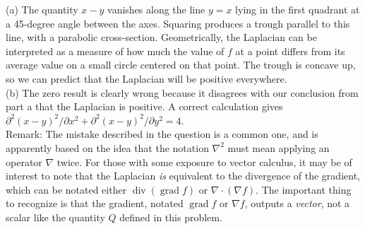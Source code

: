 (a) The quantity $x-y$ vanishes along the line $y=x$ lying in the
first quadrant at a 45-degree angle between the axes. Squaring produces
a trough parallel to this line, with a parabolic cross-section. Geometrically,
the Laplacian can be interpreted as a measure of how much the value of $f$
at a point differs from its average value on a small circle centered on
that point. The trough is concave up, so we can predict that the Laplacian
will be positive everywhere.\\
(b) The zero result is clearly wrong because it disagrees with our conclusion
from part a that the Laplacian is positive. A correct calculation gives
$\partial^2(x-y)^2/\partial x^2+\partial^2(x-y)^2/\partial y^2=4$.\\
Remark: The mistake described in the question is a common one, and is apparently
based on the idea that the notation $\nabla^2$ must mean applying an operator
$\nabla$ twice. For those with some exposure to vector calculus, it may be
of interest to note that the Laplacian \emph{is} equivalent to the divergence
of the gradient, which can be notated either $\operatorname{div}(\operatorname{grad} f)$ or
$\nabla\cdot(\nabla f)$. The important thing to recognize is that the gradient,
notated $\operatorname{grad} f$ or $\nabla f$, outputs a \emph{vector}, not a scalar
like the quantity $Q$ defined in this problem.
